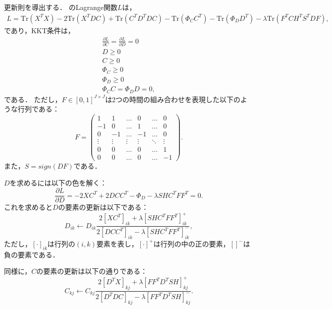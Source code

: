 更新則を導出する．
のLagrange関数$L$は，
\begin{eqnarray}
	L = \text{Tr}(X^TX) - 2 \text{Tr}(X^TDC) + \text{Tr}(C^TD^TDC) - \text{Tr}(\Phi_C C^T) - \text{Tr}(\Phi_D D^T) - \lambda \text{Tr} (F^T C H^T S^T D F),
\end{eqnarray}
であり，KKT条件は，
\begin{eqnarray}
	\frac{\partial L}{\partial C} = \frac{\partial L}{\partial D} = 0 \\
	D \geq 0 \\
	C \geq 0 \\
	\Phi_C \geq 0 \\
	\Phi_D \geq 0 \\
	\Phi_C C = \Phi_D D = 0,
\end{eqnarray}
である．
ただし，$F \in [0,1]^{J \times J}$は2つの時間の組み合わせを表現した以下のような行列である：
\begin{equation}
	F = \left(
    \begin{array}{cccccc}
			1 & 1 & \ldots & 0 & \ldots & 0 \\
			-1 & 0 & \ldots & 1 & \ldots & 0 \\
			0 & -1 & \ldots & -1 & \ldots & 0 \\
			\vdots & \vdots & \vdots & \vdots & \ddots & \vdots \\
			0 & 0 & \ldots & 0 & \ldots & 1 \\
			0 & 0 & \ldots & 0 & \ldots & -1
    \end{array}
  \right).
\end{equation}
また，$S = sign(DF)$である．

$D$を求めるには以下の色を解く：
\begin{equation}
	\frac{\partial L}{\partial D} = - 2 X C^T + 2 DCC^T - \Phi_D - \lambda SHC^T FF^T = 0.
\end{equation}
これを求めると$D$の要素の更新は以下である：
\begin{equation}
	D_{ik} \leftarrow D_{ik} \frac{2[XC^T]_{ik} + \lambda [SHC^T FF^T]_{ik}^+}{2[DCC^T]_{ik} - \lambda [SHC^T FF^T]_{ik}^-},
\end{equation}
ただし，$[\cdot]_{ik}$は行列の$(i,k)$要素を表し，$[\cdot]^+$は行列の中の正の要素，$[]^-$は負の要素である．

同様に，$C$の要素の更新は以下の通りである：
\begin{equation}
	C_{kj} \leftarrow C_{kj} \frac{2[D^T X]_{kj} + \lambda [FF^T D^T SH]_{kj}^+}{2[D^T DC]_{kj} - \lambda [FF^T D^T SH]_{kj}^-}.
\end{equation}

